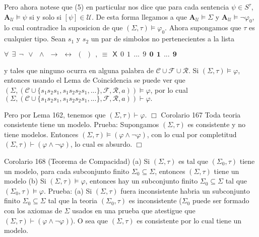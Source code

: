Pero ahora notese que (5) en particular nos dice que para cada sentencia \( \psi \in S^{\tau }\), \(\mathbf{A}_{\mathcal{U}}\models \psi \) si y solo si \( [\psi ]\in \mathcal{U}.\) De esta forma llegamos a que \(\mathbf{A}_{\mathcal{U }}\models \Sigma \) y \(\mathbf{A}_{\mathcal{U}}\models \lnot \varphi _{0}\), lo cual contradice la suposicion de que \((\Sigma ,\tau )\models \varphi _{0}. \)
Ahora supongamos que \(\tau \) es cualquier tipo. Sean \(s_{1}\) y \(s_{2}\) un par de simbolos no pertenecientes a la lista

\(\displaystyle \forall \ \ \exists \ \ \lnot \ \ \vee \ \ \wedge \ \ \rightarrow \ \ \leftrightarrow \ \ (\ \ )\ \ ,\ \equiv \ \ \mathsf{X}\ \ \mathit{0}\ \ \mathit{1}\ \ ...\ \ \mathit{9}\ \ \mathbf{0}\ \ \mathbf{1}\ \ ...\ \ \mathbf{9} \)

y tales que ninguno ocurra en alguna palabra de \(\mathcal{C}\cup \mathcal{F} \cup \mathcal{R}.\) Si \((\Sigma ,\tau )\models \varphi \), entonces usando el Lema de Coincidencia se puede ver que \((\Sigma ,(\mathcal{C}\cup \{s_{1}s_{2}s_{1},s_{1}s_{2}s_{2}s_{1},...\},\mathcal{F},\mathcal{R} ,a))\models \varphi \), por lo cual
\(\displaystyle (\Sigma ,(\mathcal{C}\cup \{s_{1}s_{2}s_{1},s_{1}s_{2}s_{2}s_{1},...\}, \mathcal{F},\mathcal{R},a))\vdash \varphi . \)

Pero por Lema 162, tenemos que \((\Sigma ,\tau )\vdash \varphi .\) \(\Box\)
Corolario 167 Toda teoria consistente tiene un modelo.
Prueba: Supongamos \((\Sigma ,\tau )\) es consistente y no tiene modelos. Entonces \( (\Sigma ,\tau )\models \left( \varphi \wedge \lnot \varphi \right) \), con lo cual por completitud \((\Sigma ,\tau )\vdash \left( \varphi \wedge \lnot \varphi \right) \), lo cual es absurdo. \(\Box\)

Corolario 168 (Teorema de Compacidad)
(a) Si \((\Sigma ,\tau )\) es tal que \((\Sigma _{0},\tau )\) tiene un modelo, para cada subconjunto finito \(\Sigma _{0}\subseteq \Sigma \), entonces \((\Sigma ,\tau )\) tiene un modelo
(b) Si \((\Sigma ,\tau )\models \varphi \), entonces hay un subconjunto finito \(\Sigma _{0}\subseteq \Sigma \) tal que \((\Sigma _{0},\tau )\models \varphi \).
Prueba: (a) Si \((\Sigma ,\tau )\) fuera inconsistente habria un subconjunto finito \( \Sigma _{0}\subseteq \Sigma \) tal que la teoria \((\Sigma _{0},\tau )\) es inconsistente (\(\Sigma _{0}\) puede ser formado con los axiomas de \(\Sigma \) usados en una prueba que atestigue que \((\Sigma ,\tau )\vdash \left( \varphi \wedge \lnot \varphi \right) \)). O sea que \((\Sigma ,\tau )\) es consistente por lo cual tiene un modelo.

